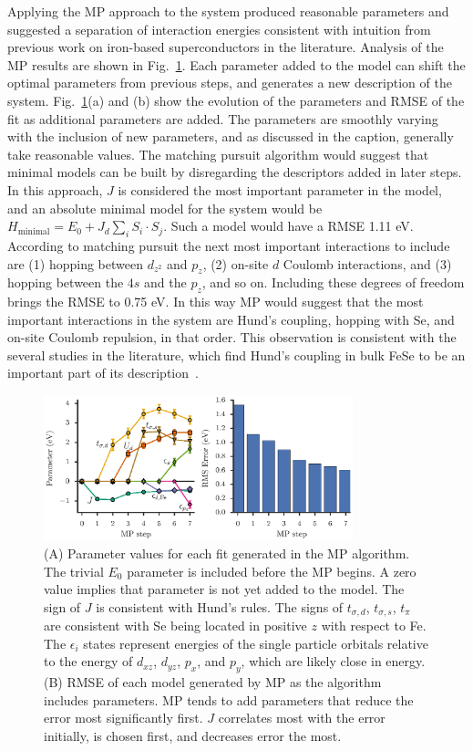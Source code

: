 Applying the MP approach to the system produced reasonable parameters and suggested a separation of interaction energies consistent with intuition from previous work on iron-based superconductors in the literature.
Analysis of the MP results are shown in Fig.~\ref{fig:fese}. 
Each parameter added to the model can shift the optimal parameters from previous steps, and generates a new description of the system. 
Fig.~\ref{fig:fese}(a) and (b) show the evolution of the parameters and RMSE of the fit as additional parameters are added.
The parameters are smoothly varying with the inclusion of new parameters, and as discussed in the caption, generally take reasonable values.
The matching pursuit algorithm would suggest that minimal models can be built by disregarding the descriptors added in later steps.
In this approach, $J$ is considered the most important parameter in the model, and an absolute minimal model for the system would be $H_\text{minimal} = E_0 + J_d \sum_i S_i \cdot S_j$. 
Such a model would have a RMSE 1.11 eV. 
According to matching pursuit the next most important interactions to include are (1) hopping between $d_{z^2}$ and $p_z$, (2) on-site $d$ Coulomb interactions, and (3) hopping between the $4s$ and the $p_z$, and so on. 
Including these degrees of freedom brings the RMSE to 0.75 eV.
In this way MP would suggest that the most important interactions in the system are Hund's coupling, hopping with Se, and on-site Coulomb repulsion, in that order.
This observation is consistent with the several studies in the literature, which find Hund's coupling in bulk FeSe to be an important part of its description~\cite{hunds}.

\begin{figure}[htb]
  \centering
  \includegraphics[width=0.8\textwidth]{./Figures/fese.eps}
  \caption{
    \label{fig:fese} 
    (A) Parameter values for each fit generated in the MP algorithm. 
    The trivial $E_0$ parameter is included before the MP begins.
    A zero value implies that parameter is not yet added to the model.
    The sign of $J$ is consistent with Hund's rules. 
    The signs of $t_{\sigma,d}$, $t_{\sigma,s}$, $t_\pi$ are consistent with Se being located in positive $z$ with respect to Fe. 
    The $\epsilon_i$ states represent energies of the single particle orbitals relative to the energy of $d_{xz}$, $d_{yz}$, $p_x$, and $p_y$, which are likely close in energy.
    (B) RMSE of each model generated by MP as the algorithm includes parameters. 
    MP tends to add parameters that reduce the error most significantly first. 
    $J$ correlates most with the error initially, is chosen first, and decreases error the most.
  }
\end{figure}
